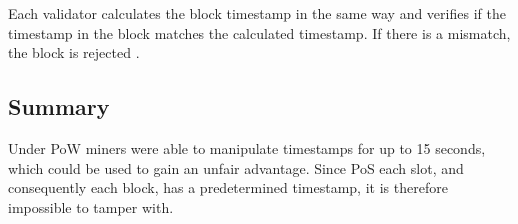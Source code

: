 Each validator calculates the block timestamp in the same way and verifies if
the timestamp in the block matches the calculated timestamp. If there is a
mismatch, the block is rejected \cite{process-execution-payload}.

\subsection{Summary}

Under PoW miners were able to manipulate timestamps for up to 15 seconds, which
could be used to gain an unfair advantage. Since PoS each slot, and
consequently each block, has a predetermined timestamp, it is
therefore impossible to tamper with.

